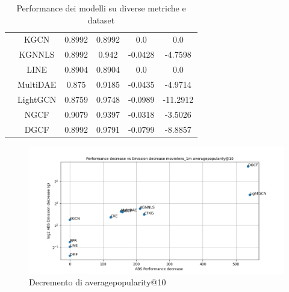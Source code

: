 \begin{table}[H]
{\begin{tabular}{|c|c|c|c|c|c|}
                                           & KGCN     & 0.8992                  & 0.8992                    & 0.0               & 0.0               \\ \cline{2-6}
                                           & KGNNLS   & 0.8992                  & 0.942                     & -0.0428           & -4.7598           \\ \cline{2-6}
                                           & LINE     & 0.8904                  & 0.8904                    & 0.0               & 0.0               \\ \cline{2-6}
                                           & MultiDAE & 0.875                   & 0.9185                    & -0.0435           & -4.9714           \\ \cline{2-6}
                                           & LightGCN & 0.8759                  & 0.9748                    & -0.0989           & -11.2912          \\ \cline{2-6}
                                           & NGCF     & 0.9079                  & 0.9397                    & -0.0318           & -3.5026           \\ \cline{2-6}
                                           & DGCF     & 0.8992                  & 0.9791                    & -0.0799           & -8.8857           \\ \hline
        \end{tabular}
    }
    \caption{Performance dei modelli su diverse metriche e dataset }
\end{table}



\begin{figure}[H]
    \centering
     \includegraphics[width=\textwidth]{images/decrement_averagepopularity@10_movielens_1m_40_7.png}
    \caption{Decremento di averagepopularity@10}
\end{figure}

